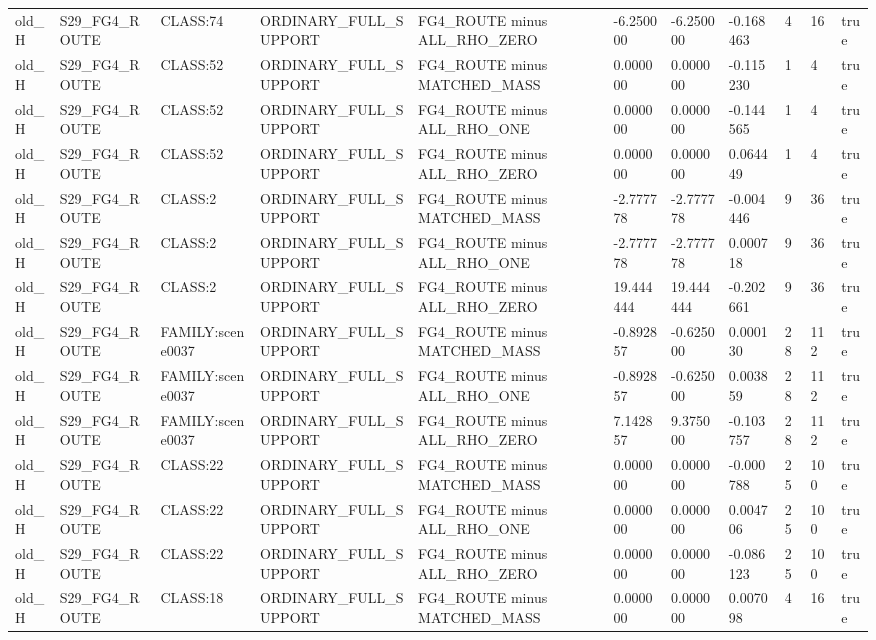 \begin{tabular}{lllllllllll}
old\_H & S29\_FG4\_ROUTE & CLASS:74 & ORDINARY\_FULL\_SUPPORT & FG4\_ROUTE minus ALL\_RHO\_ZERO & -6.250000 & -6.250000 & -0.168463 & 4 & 16 & true \\
old\_H & S29\_FG4\_ROUTE & CLASS:52 & ORDINARY\_FULL\_SUPPORT & FG4\_ROUTE minus MATCHED\_MASS & 0.000000 & 0.000000 & -0.115230 & 1 & 4 & true \\
old\_H & S29\_FG4\_ROUTE & CLASS:52 & ORDINARY\_FULL\_SUPPORT & FG4\_ROUTE minus ALL\_RHO\_ONE & 0.000000 & 0.000000 & -0.144565 & 1 & 4 & true \\
old\_H & S29\_FG4\_ROUTE & CLASS:52 & ORDINARY\_FULL\_SUPPORT & FG4\_ROUTE minus ALL\_RHO\_ZERO & 0.000000 & 0.000000 & 0.064449 & 1 & 4 & true \\
old\_H & S29\_FG4\_ROUTE & CLASS:2 & ORDINARY\_FULL\_SUPPORT & FG4\_ROUTE minus MATCHED\_MASS & -2.777778 & -2.777778 & -0.004446 & 9 & 36 & true \\
old\_H & S29\_FG4\_ROUTE & CLASS:2 & ORDINARY\_FULL\_SUPPORT & FG4\_ROUTE minus ALL\_RHO\_ONE & -2.777778 & -2.777778 & 0.000718 & 9 & 36 & true \\
old\_H & S29\_FG4\_ROUTE & CLASS:2 & ORDINARY\_FULL\_SUPPORT & FG4\_ROUTE minus ALL\_RHO\_ZERO & 19.444444 & 19.444444 & -0.202661 & 9 & 36 & true \\
old\_H & S29\_FG4\_ROUTE & FAMILY:scene0037 & ORDINARY\_FULL\_SUPPORT & FG4\_ROUTE minus MATCHED\_MASS & -0.892857 & -0.625000 & 0.000130 & 28 & 112 & true \\
old\_H & S29\_FG4\_ROUTE & FAMILY:scene0037 & ORDINARY\_FULL\_SUPPORT & FG4\_ROUTE minus ALL\_RHO\_ONE & -0.892857 & -0.625000 & 0.003859 & 28 & 112 & true \\
old\_H & S29\_FG4\_ROUTE & FAMILY:scene0037 & ORDINARY\_FULL\_SUPPORT & FG4\_ROUTE minus ALL\_RHO\_ZERO & 7.142857 & 9.375000 & -0.103757 & 28 & 112 & true \\
old\_H & S29\_FG4\_ROUTE & CLASS:22 & ORDINARY\_FULL\_SUPPORT & FG4\_ROUTE minus MATCHED\_MASS & 0.000000 & 0.000000 & -0.000788 & 25 & 100 & true \\
old\_H & S29\_FG4\_ROUTE & CLASS:22 & ORDINARY\_FULL\_SUPPORT & FG4\_ROUTE minus ALL\_RHO\_ONE & 0.000000 & 0.000000 & 0.004706 & 25 & 100 & true \\
old\_H & S29\_FG4\_ROUTE & CLASS:22 & ORDINARY\_FULL\_SUPPORT & FG4\_ROUTE minus ALL\_RHO\_ZERO & 0.000000 & 0.000000 & -0.086123 & 25 & 100 & true \\
old\_H & S29\_FG4\_ROUTE & CLASS:18 & ORDINARY\_FULL\_SUPPORT & FG4\_ROUTE minus MATCHED\_MASS & 0.000000 & 0.000000 & 0.007098 & 4 & 16 & true \\

\end{tabular}
